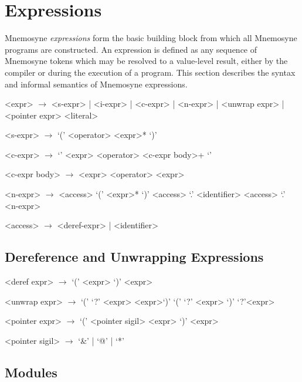 \section{Expressions}\label{sec:expr}

Mnemosyne \textit{expressions} form the basic building block from which all Mnemosyne programs are constructed. An expression is defined as any sequence of Mnemosyne tokens which may be resolved to a value-level result, either by the compiler or during the execution of a program. This section describes the syntax and informal semantics of Mnemosyne expressions.

\begin{grammar}
    <expr> $\to$ <s-expr> | <i-expr> | <c-expr> | <n-expr>
             | <unwrap expr> | <pointer expr>
            \alt <literal>


    <s-expr> $\to$ `(' <operator>  <expr>* `)'

    <c-expr> $\to$ `{' <expr> <operator> <c-expr body>+ `}'

    <c-expr body> $\to$ <expr> <operator>
                   \alt <expr>

    <n-expr> $\to$ <access> `(' <expr>* `)'
              \alt <access> `.' <identifier>
              \alt <access> `.' <n-expr>

    <access> $\to$ <deref-expr> | <identifier>

\end{grammar}

\subsection{Dereference and Unwrapping Expressions}
\begin{grammar}

    <deref expr> $\to$ `(' \lit{\$} <expr> `)'
                  \alt \lit{\$} <expr>

    <unwrap expr> $\to$ `(' `?' <expr> <expr>`)'
                   \alt `(' `?' <expr> `)'
                   \alt `?'<expr>

    <pointer expr> $\to$ `(' <pointer sigil> <expr> `)'
                     <expr>

    <pointer sigil> $\to$ `&' | `@' | `*'
\end{grammar}

\subsection{Modules}

